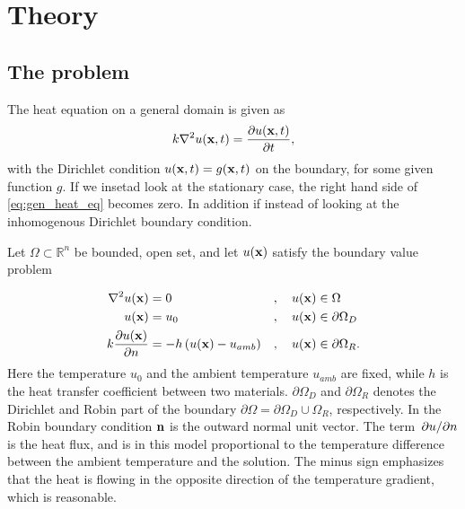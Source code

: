 \section{Theory}
\subsection{The problem}
The heat equation on a general domain is given as
\begin{equation}
	k\laplacian{u(\vb{x},t)} = \pdv{u(\vb{x},t)}{t}
	\label{eq:gen_heat_eq},
\end{equation}
with the Dirichlet condition $u(\vb{x},t) = g(\vb{x},t)$ on the boundary, for some given function $g$. If we insetad look at the stationary case, the right hand side of \eqref{eq:gen_heat_eq} becomes zero. In addition if instead of looking at the inhomogenous Dirichlet boundary condition.

Let $\Omega \subset \mathbb{R}^n$ be bounded, open set, and let $u(\vb{x})$ satisfy the boundary value problem 

\begin{alignat}{3}
	\laplacian{u(\vb{x})} &= 0 &&,\quad u(\vb{x}) \in \Omega \\
	u(\vb{x}) &= u_0 &&,\quad u(\vb{x}) \in \partial\Omega_D \\
	k\pdv{u(\vb{x})}{n} &= -h\left(u(\vb{x}) - u_{amb} \right) &&, \quad u(\vb{x}) \in \partial\Omega_R.
	\label{eq:heat_bvp}
\end{alignat}
Here the temperature $u_0$ and the ambient temperature $u_{amb}$ are fixed, while $h$ is the heat transfer coefficient between two materials. $\partial\Omega_D$ and $\partial\Omega_R$ denotes the Dirichlet and Robin part of the boundary $\partial\Omega = \partial\Omega_D\cup\Omega_R$, respectively. In the Robin boundary condition  $\vb{n}$ is the outward normal unit vector. The term $\pdv*{u}{n}$ is the heat flux, and is in this model proportional to the temperature difference between the ambient temperature and the solution. The minus sign emphasizes that the heat is flowing in the opposite direction of the temperature gradient, which is reasonable.

